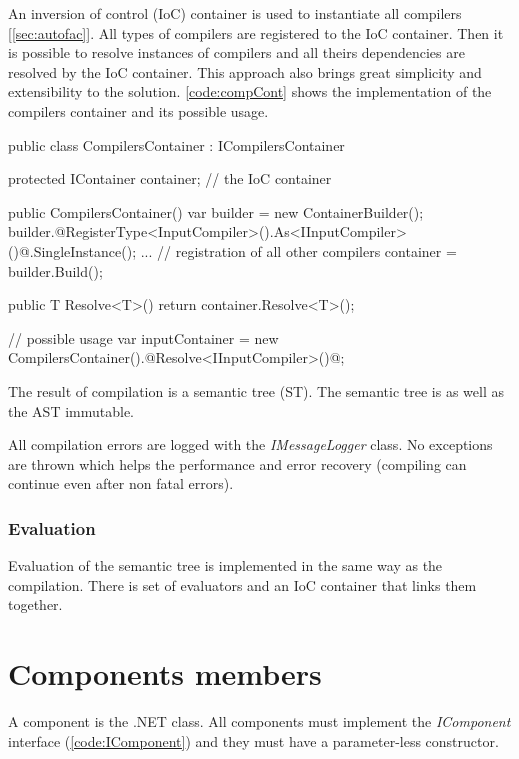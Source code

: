 An inversion of control (IoC) container is used to instantiate all compilers [\ref{sec:autofac}].
All types of compilers are registered to the IoC container.
Then it is possible to resolve instances of compilers and all theirs dependencies are resolved by the IoC container.
This approach also brings great simplicity and extensibility to the solution.
\autoref{code:compCont} shows the implementation of the compilers container and its possible usage.

\begin{Csharp}[label=code:compCont,caption={General interface for compilers and interface for the expression compiler}]
public class CompilersContainer : ICompilersContainer {
	protected IContainer container;  // the IoC container	

	public CompilersContainer() {
		var builder = new ContainerBuilder();
		builder.@RegisterType<InputCompiler>().As<IInputCompiler>()@.SingleInstance();
		...  // registration of all other compilers
		container = builder.Build();
	}

	public T Resolve<T>() {
		return container.Resolve<T>();
	}
}

// possible usage
var inputContainer = new CompilersContainer().@Resolve<IInputCompiler>()@;
\end{Csharp}

The result of compilation is a semantic tree (ST).
The semantic tree is as well as the AST immutable.

All compilation errors are logged with the \emph{IMessageLogger} class.
No exceptions are thrown which helps the performance and error recovery (compiling can continue even after non fatal errors). 


\subsubsection*{Evaluation}

Evaluation of the semantic tree is implemented in the same way as the compilation.
There is set of evaluators and an IoC container that links them together.



\section{Components members}
\label{sec:compImplementaion}

A component is the .NET class.
All components must implement the \emph{IComponent} interface (\autoref{code:IComponent}) and they must have a parameter-less constructor.

